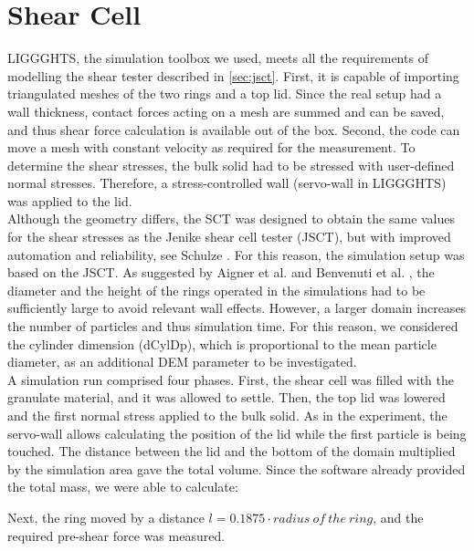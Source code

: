 \section{Shear Cell}
\label{sec:scsimulation}

\acs{LIGGGHTS}, the simulation toolbox we used, meets all the requirements of
modelling the shear tester described in \ref{sec:jsct}. 
First, it is capable of importing triangulated meshes of the two rings and a top lid. 
Since the real setup had a wall thickness, contact forces acting on a mesh are summed and can be saved, 
and thus shear force calculation is available out of the box. 
Second, the code can move a mesh with constant 
velocity as required for the measurement. 
To determine the shear stresses, the bulk solid had to be stressed with 
user-defined normal stresses. 
Therefore, a stress-controlled wall (servo-wall in \acs{LIGGGHTS}) was applied to the lid. \\
Although the geometry differs, the \acs{SCT} was designed to obtain the same values for the shear stresses as the 
Jenike shear cell tester (\acs{JSCT}), but with improved automation and reliability,
see Schulze \cite{RefWorks:118}. 
For this reason, the simulation setup was
based on the \acs{JSCT}.
As suggested by Aigner et al. \cite{RefWorks:139} and Benvenuti et al. \cite{RefWorks:173}, 
the diameter and the height of the rings operated in the simulations had to be sufficiently large to avoid relevant wall effects. 
However, a larger domain increases the number of particles and thus
simulation time.
For this reason, we considered the cylinder dimension (\acs{dCylDp}), which is
proportional to the mean particle diameter, as an additional \acs{DEM}
parameter to be investigated. \\
A simulation run comprised four phases. 
First, the shear cell was filled with the granulate material, and it was allowed
to settle.
Then, the top lid was lowered and the first normal stress applied to the bulk
solid.
As in the experiment, the servo-wall allows calculating the position of the lid
while the first particle is being touched. 
The distance between the lid and the bottom of the domain multiplied by the 
simulation area gave the total volume.
Since the software already provided the total mass, we were able to calculate:

Next, the ring moved by a distance $l=0.1875 \cdot radius ~of ~the ~ring$, and
the required pre-shear force was measured.
